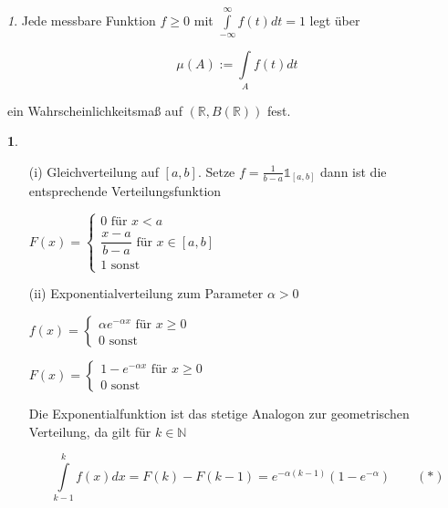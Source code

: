 \documentclass[10pt,a4paper]{report}
\newcommand{\N}{\mathbb{N}}
\newcommand{\R}{\mathbb{R}}
\numberwithin{equation}{section}
\numberwithin{figure}{section}
\theoremstyle{plain}
\theoremstyle{definition}
\newtheorem{example}[thm]{\protect\examplename}
\theoremstyle{remark}
\newtheorem{rem}[thm]{\protect\remarkname}
\theoremstyle{plain}
\providecommand{\examplename}{Beispiel}
\providecommand{\remarkname}{Bemerkung}
\newcommand{\1}{ \mathbb{1} } %
\begin{document}
\begin{rem}
  Jede messbare Funktion $f \geq 0$ mit $\int\limits_{-\infty}^\infty
  f(t)dt=1$ legt über
  \begin{center}
    \[\mu(A):=\int\limits_Af(t)dt\]
  \end{center}
  ein Wahrscheinlichkeitsmaß auf $(\R,B(\R))$ fest.
\end{rem}
\begin{example} \ 
  \begin{itemize}
  \item[(i)] Gleichverteilung auf $[a,b]$. Setze
    $f=\frac{1}{b-a}\1_[a,b]$ dann ist die entsprechende
    Verteilungsfunktion
    \begin{center}
      $F(x)=\begin{cases}
        0 \text{ für } x < a\\
        \dfrac{x-a}{b-a} \text{ für } x \in [a,b]\\
        1 \text{ sonst }
      \end{cases}$
    \end{center}
  \item[(ii)]  Exponentialverteilung zum Parameter $\alpha >0$
    \begin{center}
      $f(x)=\begin{cases}
        \alpha e^{-\alpha x} \text{ für } x \geq 0\\
        0 \text{ sonst }
      \end{cases}$
    \end{center}
    \begin{center}
      $F(x)=\begin{cases}
        1-e^{-\alpha x} \text{ für } x \geq 0\\
        0 \text{ sonst }
      \end{cases}$
    \end{center}
    Die Exponentialfunktion ist das stetige Analogon zur geometrischen
    Verteilung, da gilt für $k \in \N$

      \[ \int\limits_{k-1}^k
      f(x)dx=F(k)-F(k-1)=e^{-\alpha(k-1)}(1-e^{-\alpha}) \qquad (*)\]


\end{itemize}
\end{example}
\end{document}
